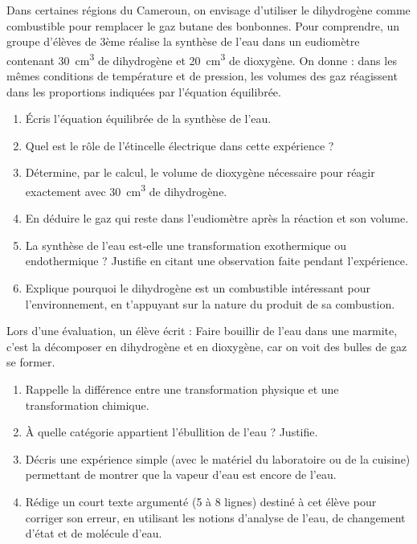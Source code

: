 \documentclass[11pt]{article}
\begin{document}
\begin{exercice}
Dans certaines régions du Cameroun, on envisage d'utiliser le dihydrogène comme combustible pour remplacer le gaz butane des bonbonnes. Pour comprendre, un groupe d'élèves de 3ème réalise la synthèse de l'eau dans un eudiomètre contenant \SI{30}{cm^3} de dihydrogène et \SI{20}{cm^3} de dioxygène. On donne : dans les mêmes conditions de température et de pression, les volumes des gaz réagissent dans les proportions indiquées par l'équation équilibrée.
\begin{enumerate}
\item Écris l'équation équilibrée de la synthèse de l'eau.
\item Quel est le rôle de l'étincelle électrique dans cette expérience ?
\item Détermine, par le calcul, le volume de dioxygène nécessaire pour réagir exactement avec \SI{30}{cm^3} de dihydrogène.
\item En déduire le gaz qui reste dans l'eudiomètre après la réaction et son volume.
\item La synthèse de l'eau est-elle une transformation exothermique ou endothermique ? Justifie en citant une observation faite pendant l'expérience.
\item Explique pourquoi le dihydrogène est un combustible intéressant pour l'environnement, en t'appuyant sur la nature du produit de sa combustion.
\end{enumerate}
\end{exercice}

\begin{exercice}
Lors d'une évaluation, un élève écrit : \og Faire bouillir de l'eau dans une marmite, c'est la décomposer en dihydrogène et en dioxygène, car on voit des bulles de gaz se former. \fg
\begin{enumerate}
\item Rappelle la différence entre une transformation physique et une transformation chimique.
\item À quelle catégorie appartient l'ébullition de l'eau ? Justifie.
\item Décris une expérience simple (avec le matériel du laboratoire ou de la cuisine) permettant de montrer que la vapeur d'eau est encore de l'eau.
\item Rédige un court texte argumenté (5 à 8 lignes) destiné à cet élève pour corriger son erreur, en utilisant les notions d'analyse de l'eau, de changement d'état et de molécule d'eau.
\end{enumerate}
\end{exercice}
\end{document}
